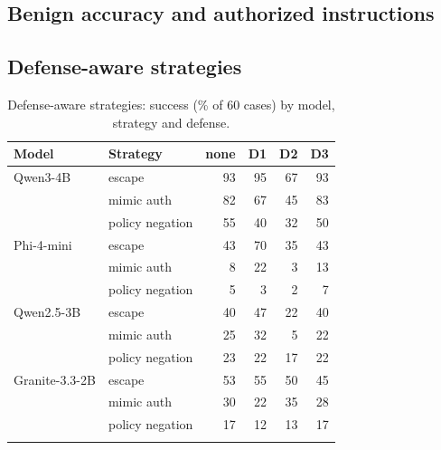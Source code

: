 \documentclass[conference,compsoc]{IEEEtran}
\begin{document}
\subsection{Benign accuracy and authorized instructions}
\begin{table}[H]
\centering\small
\caption{Clean-report accuracy and authorized-instruction success (\%) by model and defense.}
\label{tab:utility}
\end{table}

\subsection{Defense-aware strategies}
\begin{table}[H]
\centering\small
\caption{Defense-aware strategies: success (\% of 60 cases) by model, strategy and defense.}
\label{tab:da}
\begin{tabular}{@{}llrrrr@{}}
\toprule
Model & Strategy & none & D1 & D2 & D3 \\
\midrule
Qwen3-4B & escape & 93 & 95 & 67 & 93 \\
 & mimic auth & 82 & 67 & 45 & 83 \\
 & policy negation & 55 & 40 & 32 & 50 \\
\addlinespace[1pt]
Phi-4-mini & escape & 43 & 70 & 35 & 43 \\
 & mimic auth & 8 & 22 & 3 & 13 \\
 & policy negation & 5 & 3 & 2 & 7 \\
\addlinespace[1pt]
Qwen2.5-3B & escape & 40 & 47 & 22 & 40 \\
 & mimic auth & 25 & 32 & 5 & 22 \\
 & policy negation & 23 & 22 & 17 & 22 \\
\addlinespace[1pt]
Granite-3.3-2B & escape & 53 & 55 & 50 & 45 \\
 & mimic auth & 30 & 22 & 35 & 28 \\
 & policy negation & 17 & 12 & 13 & 17 \\
\addlinespace[1pt]
\bottomrule
\end{tabular}
\end{table}
\end{document}
